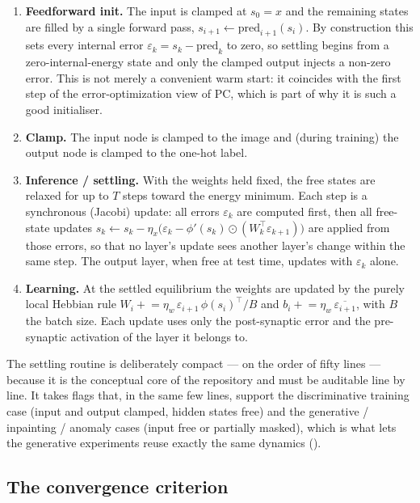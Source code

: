 \begin{enumerate}
  \item \textbf{Feedforward init.} The input is clamped at $s_0 = x$ and the remaining states are
  filled by a single forward pass, $s_{i+1} \gets \mathrm{pred}_{i+1}(s_i)$. By construction this
  sets every internal error $\varepsilon_k = s_k - \mathrm{pred}_k$ to zero, so settling begins from a
  zero-internal-energy state and only the clamped output injects a non-zero error. This is not merely
  a convenient warm start: it coincides with the first step of the error-optimization view of PC, which
  is part of why it is such a good initialiser.
  \item \textbf{Clamp.} The input node is clamped to the image and (during training) the output node
  is clamped to the one-hot label.
  \item \textbf{Inference / settling.} With the weights held fixed, the free states are relaxed for up
  to $T$ steps toward the energy minimum. Each step is a synchronous (Jacobi) update: all errors
  $\varepsilon_k$ are computed first, then all free-state updates
  $s_k \gets s_k - \eta_x\big(\varepsilon_k - \phi'(s_k)\odot (W_k^{\!\top}\varepsilon_{k+1})\big)$ are
  applied from those errors, so that no layer's update sees another layer's change within the same step.
  The output layer, when free at test time, updates with $\varepsilon_k$ alone.
  \item \textbf{Learning.} At the settled equilibrium the weights are updated by the purely local
  Hebbian rule $W_i \mathrel{+}= \eta_w\,\varepsilon_{i+1}\,\phi(s_i)^{\!\top}/B$ and
  $b_i \mathrel{+}= \eta_w\,\overline{\varepsilon_{i+1}}$, with $B$ the batch size. Each update uses only the
  post-synaptic error and the pre-synaptic activation of the layer it belongs to.
\end{enumerate}

The settling routine is deliberately compact --- on the order of fifty lines --- because it is the
conceptual core of the repository and must be auditable line by line. It takes flags that, in the same
few lines, support the discriminative training case (input and output clamped, hidden states free) and
the generative / inpainting / anomaly cases (input free or partially masked), which is what lets the
generative experiments reuse exactly the same dynamics ().

\subsection{The convergence criterion}

